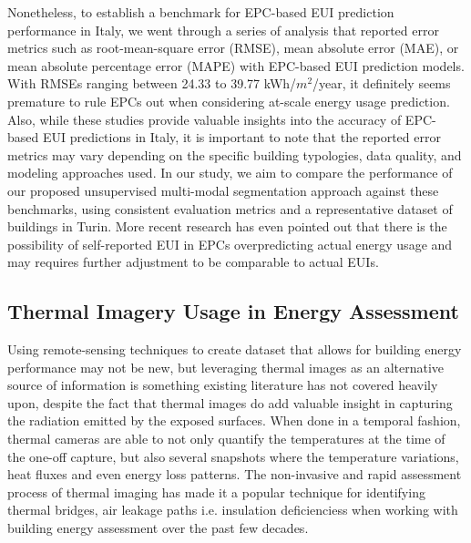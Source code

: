 \documentclass[preprint,12pt]{elsarticle}
\begin{document}
    Nonetheless, to establish a benchmark for EPC-based EUI prediction performance in Italy, we went through a series of analysis that reported error metrics such as root-mean-square error (RMSE), mean absolute error (MAE), or mean absolute percentage error (MAPE) with EPC-based EUI prediction models. With RMSEs ranging between 24.33\cite{sylten_wikell_predicting_2024} to 39.77 kWh/$m^2$/year\cite{araujo_optimizing_2024}, it definitely seems premature to rule EPCs out when considering at-scale energy usage prediction\cite{pasichnyi_energy_2019}. Also, while these studies provide valuable insights into the accuracy of EPC-based EUI predictions in Italy, it is important to note that the reported error metrics may vary depending on the specific building typologies, data quality, and modeling approaches used. In our study, we aim to compare the performance of our proposed unsupervised multi-modal segmentation approach against these benchmarks, using consistent evaluation metrics and a representative dataset of buildings in Turin. More recent research has even pointed out that there is the possibility of self-reported EUI in EPCs overpredicting actual energy usage\cite{few_over-prediction_2023} and may requires further adjustment to be comparable to actual EUIs.
    \subsection{Thermal Imagery Usage in Energy Assessment}%
        Using remote-sensing techniques to create dataset that allows for building energy performance may not be new, but leveraging thermal images as an alternative source of information is something existing literature has not covered heavily upon, despite the fact that thermal images do add valuable insight in capturing the radiation emitted by the exposed surfaces\cite{fox_thermography_2014}. When done in a temporal fashion, thermal cameras are able to not only quantify the temperatures at the time of the one-off capture, but also several snapshots where the temperature variations, heat fluxes and even energy loss patterns\cite{kylili_infrared_2014}. The non-invasive and rapid assessment process of thermal imaging has made it a popular technique for identifying thermal bridges, air leakage paths i.e. insulation deficienciess\cite{nardi_quantitative_2014,ogrady_quantification_2017} when working with building energy assessment over the past few decades\cite{balaras_infrared_2002,lucchi_applications_2018}.
\end{document}

